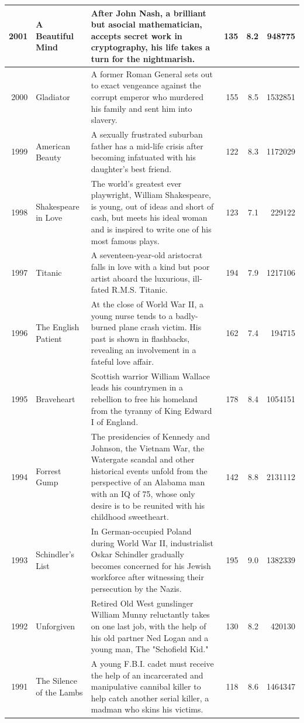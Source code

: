 \documentclass[
]{book}
\begin{document}
\begin{tabular}{r|l|l|r|r|r}
\hline
2001 & A Beautiful Mind & After John Nash, a brilliant but asocial mathematician, accepts secret work in cryptography, his life takes a turn for the nightmarish. & 135 & 8.2 & 948775\\
\hline
2000 & Gladiator & A former Roman General sets out to exact vengeance against the corrupt emperor who murdered his family and sent him into slavery. & 155 & 8.5 & 1532851\\
\hline
1999 & American Beauty & A sexually frustrated suburban father has a mid-life crisis after becoming infatuated with his daughter's best friend. & 122 & 8.3 & 1172029\\
\hline
1998 & Shakespeare in Love & The world's greatest ever playwright, William Shakespeare, is young, out of ideas and short of cash, but meets his ideal woman and is inspired to write one of his most famous plays. & 123 & 7.1 & 229122\\
\hline
1997 & Titanic & A seventeen-year-old aristocrat falls in love with a kind but poor artist aboard the luxurious, ill-fated R.M.S. Titanic. & 194 & 7.9 & 1217106\\
\hline
1996 & The English Patient & At the close of World War II, a young nurse tends to a badly-burned plane crash victim. His past is shown in flashbacks, revealing an involvement in a fateful love affair. & 162 & 7.4 & 194715\\
\hline
1995 & Braveheart & Scottish warrior William Wallace leads his countrymen in a rebellion to free his homeland from the tyranny of King Edward I of England. & 178 & 8.4 & 1054151\\
\hline
1994 & Forrest Gump & The presidencies of Kennedy and Johnson, the Vietnam War, the Watergate scandal and other historical events unfold from the perspective of an Alabama man with an IQ of 75, whose only desire is to be reunited with his childhood sweetheart. & 142 & 8.8 & 2131112\\
\hline
1993 & Schindler's List & In German-occupied Poland during World War II, industrialist Oskar Schindler gradually becomes concerned for his Jewish workforce after witnessing their persecution by the Nazis. & 195 & 9.0 & 1382339\\
\hline
1992 & Unforgiven & Retired Old West gunslinger William Munny reluctantly takes on one last job, with the help of his old partner Ned Logan and a young man, The "Schofield Kid." & 130 & 8.2 & 420130\\
\hline
1991 & The Silence of the Lambs & A young F.B.I. cadet must receive the help of an incarcerated and manipulative cannibal killer to help catch another serial killer, a madman who skins his victims. & 118 & 8.6 & 1464347\\

\end{tabular}
\end{document}
